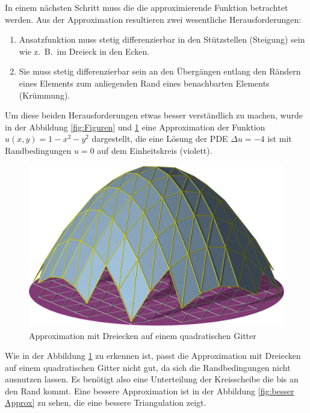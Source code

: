 In einem nächsten Schritt muss die die approximierende Funktion
betrachtet werden.
Aus der Approximation resultieren zwei wesentliche Herausforderungen:
\begin{enumerate}
	\item Ansatzfunktion muss stetig differenzierbar in den
	Stützstellen (Steigung) sein wie z.~B.~im Dreieck in den
	Ecken.
	\item Sie muss stetig differenzierbar sein an den Übergängen
	entlang den Rändern eines Elements zum anliegenden Rand eines
	benachbarten Elements (Krümmung).
\end{enumerate}
Um diese beiden Herausforderungen etwas besser verständlich zu
machen, wurde in der Abbildung \ref{fig:Figuren} und \ref{fig:Ansatz}
eine Approximation der Funktion   $u(x,y) = 1-x^2-y^2$ dargestellt,
die eine Lösung der PDE $\Delta u = -4$ ist mit Randbedingungen
$u=0$ auf dem Einheitskreis (violett).
\begin{figure}
	\centering
	\includegraphics[scale=0.8]{papers/fem/Images/ansatz.jpg}
	\caption{Approximation mit Dreiecken auf einem quadratischen Gitter }
	\label{fig:Ansatz}
\end{figure}
Wie in der Abbildung \ref{fig:Ansatz} zu erkennen ist, passt die
Approximation mit Dreiecken auf einem quadratischen Gitter nicht
gut, da sich die Randbedingungen nicht ausnutzen lassen.
Es benötigt also eine Unterteilung der Kreisscheibe die bis an den Rand kommt.
Eine bessere Approximation ist in der Abbildung \ref{fig:besser
Approx} zu sehen, die eine bessere Triangulation zeigt.
